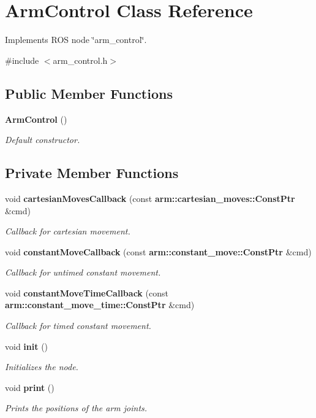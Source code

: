 \section{\-Arm\-Control \-Class \-Reference}
\label{classArmControl}


\-Implements \-R\-O\-S node \char`\"{}arm\-\_\-control\char`\"{}.  




{\ttfamily \#include $<$arm\-\_\-control.\-h$>$}

\subsection*{\-Public \-Member \-Functions}
\begin{DoxyCompactItemize}
\item 
{\bf \-Arm\-Control} ()
\begin{DoxyCompactList}\small\item\em \-Default constructor. \end{DoxyCompactList}\end{DoxyCompactItemize}
\subsection*{\-Private \-Member \-Functions}
\begin{DoxyCompactItemize}
\item 
void {\bf cartesian\-Moves\-Callback} (const {\bf arm\-::cartesian\-\_\-moves\-::\-Const\-Ptr} \&cmd)
\begin{DoxyCompactList}\small\item\em \-Callback for cartesian movement. \end{DoxyCompactList}\item 
void {\bf constant\-Move\-Callback} (const {\bf arm\-::constant\-\_\-move\-::\-Const\-Ptr} \&cmd)
\begin{DoxyCompactList}\small\item\em \-Callback for untimed constant movement. \end{DoxyCompactList}\item 
void {\bf constant\-Move\-Time\-Callback} (const {\bf arm\-::constant\-\_\-move\-\_\-time\-::\-Const\-Ptr} \&cmd)
\begin{DoxyCompactList}\small\item\em \-Callback for timed constant movement. \end{DoxyCompactList}\item 
void {\bf init} ()
\begin{DoxyCompactList}\small\item\em \-Initializes the node. \end{DoxyCompactList}\item 
void {\bf print} ()
\begin{DoxyCompactList}\small\item\em \-Prints the positions of the arm joints. \end{DoxyCompactList}\end{DoxyCompactItemize}

